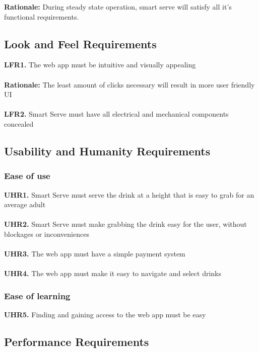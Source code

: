 \documentclass{article}
\begin{document}
    \textbf{Rationale:} During steady state operation, smart serve will satisfy all it's functional requirements.\\
\subsection{Look and Feel Requirements}
    \noindent\textbf{LFR1.} The web app must be intuitive and visually appealing \\\\
    \indent\textbf{Rationale:} The least amount of clicks necessary will result in more user friendly UI\\\\
    \textbf{LFR2.} Smart Serve must have all electrical and mechanical components concealed \\

\subsection{Usability and Humanity Requirements}
    \subsubsection{Ease of use}
        \noindent\textbf{UHR1.} Smart Serve must serve the drink at a height that is easy to grab for an average adult \\\\
        \textbf{UHR2.} Smart Serve must make grabbing the drink easy for the user, without blockages or inconveniences\\\\
        \textbf{UHR3.} The web app must have a simple payment system\\\\
        \textbf{UHR4.} The web app must make it easy to navigate and select drinks\\
    \subsubsection{Ease of learning}
        \noindent\textbf{UHR5.} Finding and gaining access to the web app must be easy \\

\subsection{Performance Requirements}
\end{document}
